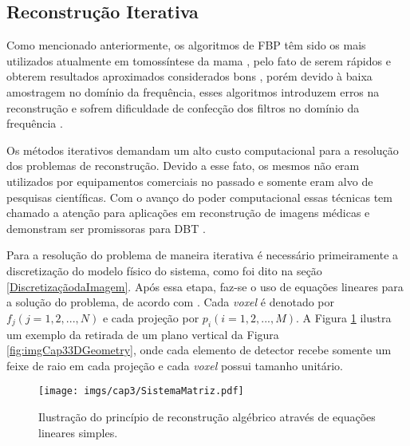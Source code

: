 
\subsection{Reconstrução Iterativa}

Como mencionado anteriormente, os algoritmos de \acs{FBP} têm sido os mais utilizados atualmente em tomossíntese da mama \cite{zheng2018detector}, pelo fato de serem rápidos e obterem resultados aproximados considerados bons \cite{das2011penalized}, porém devido à baixa amostragem no domínio da frequência, esses algoritmos introduzem erros na reconstrução e sofrem dificuldade de confecção dos filtros no domínio da frequência \cite{xu2015statistical}.

Os métodos iterativos demandam um alto custo computacional para a resolução dos problemas de reconstrução. Devido a esse fato, os mesmos não eram utilizados por equipamentos comerciais no passado e somente eram alvo de pesquisas científicas. Com o avanço do poder computacional essas técnicas tem chamado a atenção para aplicações em reconstrução de imagens médicas e demonstram ser promissoras para \acs{DBT} \cite{zeng2010medical,zheng2018detector}.

Para a resolução do problema de maneira iterativa é necessário primeiramente a discretização do modelo físico do sistema, como foi dito na seção \ref{DiscretizaçãodaImagem}. Após essa etapa, faz-se o uso de equações lineares para a solução do problema, de acordo com . Cada \textit{voxel} é denotado por $f_{j} (j=1,2,...,N)$ e cada projeção por $p_{i} (i=1,2,...,M)$. A Figura \ref{fig:imgCap3SistemaMatriz} ilustra um exemplo da retirada de um plano vertical da Figura \ref{fig:imgCap33DGeometry}, onde cada elemento de detector recebe somente um feixe de raio em cada projeção e cada \textit{voxel} possui tamanho unitário.  

\begin{figure}[H]
	\caption{Ilustração do princípio de reconstrução algébrico através de equações lineares simples.}
	\begin{center}
		\texttt{[image: imgs/cap3/SistemaMatriz.pdf]}
	\end{center}
	\label{fig:imgCap3SistemaMatriz}
\end{figure} 

